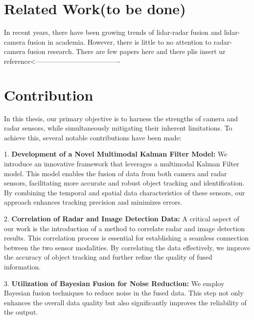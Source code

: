 
\section{Related Work\small(to be done)}\label{sec:1-related_work}
In recent years, there have been growing trends of lidar-radar fusion and lidar-camera fusion in academia.
However, there is little to no attention to radar-camera fusion research. 
There are few papers here and there plis insert ur reference<-------------------------------------


\section{Contribution}\label{sec:1-contribution}


In this thesis, our primary objective is to harness the strengths of camera and radar sensors, while simultaneously mitigating their inherent limitations. To achieve this, several notable contributions have been made:

1. \textbf{Development of a Novel Multimodal Kalman Filter Model: }
We introduce an innovative framework that leverages a multimodal Kalman Filter model. 
This model enables the fusion of data from both camera and radar sensors, 
facilitating more accurate and robust object tracking and identification. 
By combining the temporal and spatial data characteristics of these sensors, 
our approach enhances tracking precision and minimizes errors.

2. \textbf{Correlation of Radar and Image Detection Data: }
A critical aspect of our work is the introduction of a method to correlate radar and image detection results. 
This correlation process is essential for establishing a seamless connection between the two sensor modalities.
By correlating the data effectively, we improve the accuracy of object tracking and further refine the quality of fused information.

3. \textbf{Utilization of Bayesian Fusion for Noise Reduction: }
We employ Bayesian fusion techniques to reduce noise in the fused data.
This step not only enhances the overall data quality but also significantly improves the reliability of the output. 

